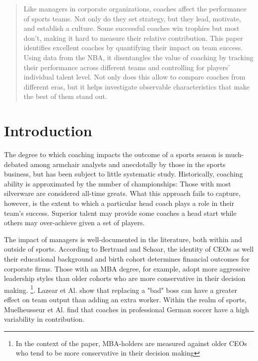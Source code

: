 \documentclass[main.tex]{subfiles}
\begin{document}
\begin{abstract}

Like managers in corporate organizations, coaches affect the performance of sports teams. Not only do they set strategy, but they lead, motivate, and establish a culture. Some successful coaches win trophies but most don't, making it hard to measure their relative contribution. This paper identifies excellent coaches by quantifying their impact on team success. Using data from the NBA, it disentangles the value of coaching by tracking their performance across different teams and controlling for players' individual talent level. Not only does this allow to compare coaches from different eras, but it helps investigate observable characteristics that make the best of them stand out. 

\end{abstract}

\section{Introduction}
    
The degree to which coaching impacts the outcome of a sports season is much-debated among armchair analysts and anecdotally by those in the sports business, but has been subject to little systematic study. Historically, coaching ability is approximated by the number of championships: Those with most silverware are considered all-time greats. What this approach fails to capture, however, is the extent to which a particular head coach plays a role in their team's success. Superior talent may provide some coaches a head start while others may over-achieve given a set of players. 

The impact of managers is well-documented in the literature, both within and outside of sports. According to Bertrand and Schoar, the identity of CEOs as well their educational background and birth cohort determines financial outcomes for corporate firms. Those with an MBA degree, for example, adopt more aggressive leadership styles than older cohorts who are more conservative in their decision making. \footnote{In the context of the paper, MBA-holders are measured against older CEOs who tend to be more conservative in their decision making}.  Lazear et Al. show that replacing a "bad" boss can have a greater effect on team output than adding an extra worker. Within the realm of sports, Muelheusseur et Al. find that coaches in professional German soccer have a high variability in contribution. 
\end{document}
